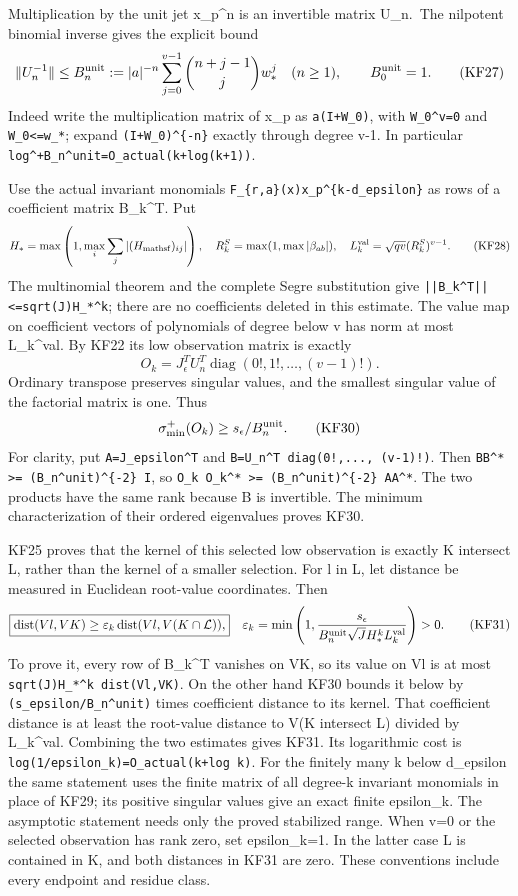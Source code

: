 Multiplication by the unit jet x\_p\^{}n is an invertible matrix U\_n.~The nilpotent binomial inverse gives the explicit bound \[
\|U_n^{-1}\|\le B_n^{\rm unit}:=
|a|^{-n}\sum_{j=0}^{v-1}\binom{n+j-1}{j}w_*^j\quad(n\ge1),
\qquad B_0^{\rm unit}=1.
\tag{KF27}
\] Indeed write the multiplication matrix of x\_p as \texttt{a(I+W\_0)}, with \texttt{W\_0\^{}v=0} and \texttt{\textbar{}\textbar{}W\_0\textbar{}\textbar{}\textless{}=w\_*}; expand \texttt{(I+W\_0)\^{}\{-n\}} exactly through degree v-1. In particular \nolinkurl{log^+B_n^unit=O_actual(k+log(k+1))}.

Use the actual invariant monomials \nolinkurl{F_{r,a}(x)x_p^{k-d_epsilon}} as rows of a coefficient matrix B\_k\^{}T. Put \[
H_* =\max\left(1,\max_i\sum_j|(H_{\rm mathsf})_{ij}|\right),
\quad R_k^S=\max(1,\max|\beta_{ab}|),\quad
L_k^{\rm val}=\sqrt{qv}(R_k^S)^{v-1}.
\tag{KF28}
\] The multinomial theorem and the complete Segre substitution give \nolinkurl{||B_k^T||<=sqrt(J)H_*^k}; there are no coefficients deleted in this estimate. The value map on coefficient vectors of polynomials of degree below v has norm at most L\_k\^{}val. By KF22 its low observation matrix is exactly \[
O_k=J_\epsilon^T U_n^T\operatorname{diag}(0!,1!,\ldots,(v-1)!).
\tag{KF29}
\] Ordinary transpose preserves singular values, and the smallest singular value of the factorial matrix is one. Thus \[
\sigma_{\min}^+(O_k)\ge s_\epsilon/B_n^{\rm unit}.
\tag{KF30}
\] For clarity, put \texttt{A=J\_epsilon\^{}T} and \nolinkurl{B=U_n^T diag(0!,..., (v-1)!)}. Then \nolinkurl{BB^* >= (B_n^unit)^{-2} I}, so \nolinkurl{O_k O_k^* >= (B_n^unit)^{-2} AA^*}. The two products have the same rank because B is invertible. The minimum characterization of their ordered eigenvalues proves KF30.

KF25 proves that the kernel of this selected low observation is exactly K intersect L, rather than the kernel of a smaller selection. For l in L, let distance be measured in Euclidean root-value coordinates. Then \[
\boxed{\operatorname{dist}(Vl,VK)
\ge\varepsilon_k\operatorname{dist}(Vl,V(K\cap\mathcal L)),}
\quad
\varepsilon_k=
\min\left(1,\frac{s_\epsilon}
 {B_n^{\rm unit}\sqrt JH_*^k L_k^{\rm val}}\right)>0.
\tag{KF31}
\] To prove it, every row of B\_k\^{}T vanishes on VK, so its value on Vl is at most \nolinkurl{sqrt(J)H_*^k dist(Vl,VK)}. On the other hand KF30 bounds it below by \nolinkurl{(s_epsilon/B_n^unit)} times coefficient distance to its kernel. That coefficient distance is at least the root-value distance to V(K intersect L) divided by L\_k\^{}val. Combining the two estimates gives KF31. Its logarithmic cost is \nolinkurl{log(1/epsilon_k)=O_actual(k+log k)}. For the finitely many k below d\_epsilon the same statement uses the finite matrix of all degree-k invariant monomials in place of KF29; its positive singular values give an exact finite epsilon\_k. The asymptotic statement needs only the proved stabilized range. When v=0 or the selected observation has rank zero, set epsilon\_k=1. In the latter case L is contained in K, and both distances in KF31 are zero. These conventions include every endpoint and residue class.


